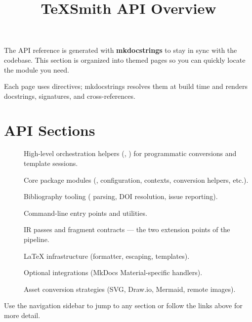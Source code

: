 \documentclass[a4paper,twoside]{article}
\title{TeXSmith API Overview}
\author{}\date{}
\begin{document}
\maketitle
The API reference is generated with \textbf{mkdocstrings} to stay in sync with the codebase. This section is organized into themed pages so you can quickly locate the module you need.

Each page uses  directives; mkdocstrings resolves them at build time and renders docstrings, signatures, and cross-references.
\section{API Sections}
\begin{description}
\item[{}] High-level orchestration helpers (, ) for programmatic conversions and template sessions.
\item[{}] Core package modules (, configuration, contexts, conversion helpers, etc.).
\item[{}] Bibliography tooling ( parsing, DOI resolution, issue reporting).
\item[{}] Command-line entry points and utilities.
\item[{}] IR passes and fragment contracts --- the two extension points of the  pipeline.
\item[{}] \LaTeX{} infrastructure (formatter, escaping, templates).
\item[{}] Optional integrations (MkDocs Material-specific handlers).
\item[{}] Asset conversion strategies (SVG, Draw.io, Mermaid, remote images).
\end{description}
Use the navigation sidebar to jump to any section or follow the links above for more detail.
\end{document}
